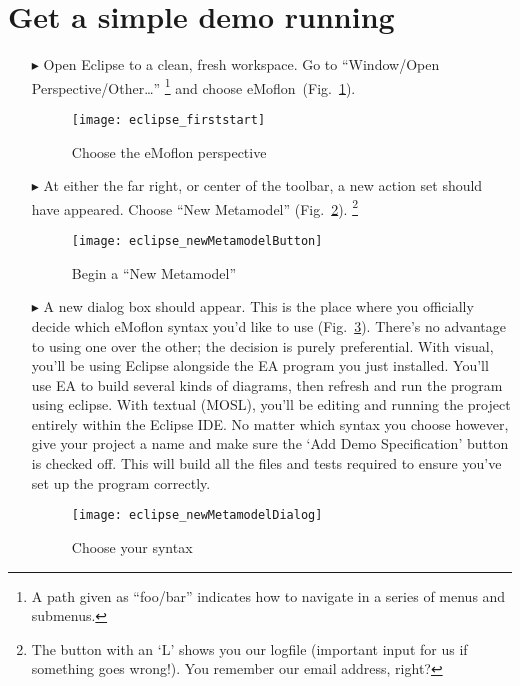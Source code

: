 \newpage
\genHeader

\section{Get a simple demo running}


\begin{itemize}
\item[$\blacktriangleright$] Open\hypertarget{simpleDemo common}{} Eclipse to a clean, fresh workspace. Go to ``Window/Open Perspective/Other\ldots''
\footnote{A path given as ``foo/bar'' indicates how to navigate in a series of menus and submenus.} and choose eMoflon~(Fig.~\ref{fig_eclipse}).

\begin{figure}[htbp]
	\centering
  \texttt{[image: eclipse\_firststart]}
	\caption{Choose the eMoflon perspective}
	\label{fig_eclipse}
\end{figure} 

\item[$\blacktriangleright$] At either the far right, or center of the toolbar, a new action set should have appeared. Choose ``New Metamodel''
(Fig.~\ref{fig_eclipseNewMetamodelButton}).
\footnote{The button with an `L' shows you our logfile (important input for us if something goes wrong!). You remember our email address, right?}

\begin{figure}[htbp]
	\centering
  \texttt{[image: eclipse\_newMetamodelButton]}
	\caption{Begin a ``New Metamodel''}
	\label{fig_eclipseNewMetamodelButton}
\end{figure}

\item[$\blacktriangleright$] A new dialog box should appear. This is the place where you officially decide which eMoflon syntax you'd like to use
(Fig.~\ref{fig_chooseSyntax}). There's no advantage to using one over the other; the decision is purely preferential. With visual, you'll be using Eclipse
alongside the EA program you just installed. You'll use EA to build several kinds of diagrams, then refresh and run the program using eclipse. With textual
(MOSL), you'll be editing and running the project entirely within the Eclipse IDE. No matter which syntax you choose however, give your project a name and make
sure the `Add Demo Specification' button is checked off. This will build all the files and tests required to ensure you've set up the program correctly.

\vspace{1cm}

\begin{figure}[htbp]
	\centering
  \texttt{[image: eclipse\_newMetamodelDialog]}
	\caption{Choose your syntax}
	\label{fig_chooseSyntax}
\end{figure} 
\end{itemize}



